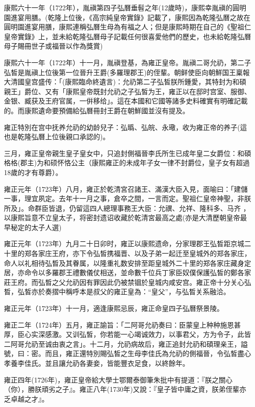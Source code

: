康熙六十一年（1722年），胤禛第四子弘曆垂髫之年(12歲時)，康熙幸胤禛的圓明園進宴用膳。(乾隆上位後，《高宗純皇帝實錄》記載了，康熙因為乾隆弘曆之故在圓明園進宴用膳，康熙連稱弘曆生母為有福之人；但是康熙時期在自己的《聖祖仁皇帝實錄》上，並未給乾隆弘曆母子記載任何很喜愛他們的歷史，也未給乾隆弘曆母子賜冊世子或福晉以作為獎賞)

康熙六十一年（1722年）十一月，胤禛登基，為雍正皇帝。胤禛二哥允礽，第二子弘皙是胤禛上位後第一位晉升王爵(多羅理郡王)的侄輩。朝鲜使臣向朝鮮国王稟報大清國皇宫盛传：「(康熙臨命終遺言)：允礽第二子弘皙朕所鍾愛，其特封为和碩親王」爵位、又有「康熙皇帝既封允礽之子弘皙为王，雍正以在邸时宫室、服御、金银、臧获及王府官属，一倂移给」。這在本國和它國等諸多史料確實有明確記載的。而康熙遺命要預備給弘曆冊封王爵在朝鮮國並沒有提及。

雍正特別在宫中抚养允礽的幼龄兒子：弘㬙、弘皖、永璥，收为雍正帝的养子(這也是乾隆弘曆上位後親口承認的)。

三月，雍正皇帝親生皇子皇女中，只追封側福晉李氏所生已成年皇二女爵位：和碩格格(郡主)为和硕怀恪公主（康熙雍正的未成年子女一律不封爵位，皇子女有超過18歲的才有尊爵）。

雍正元年（1723年）八月，雍正於乾清宮召諸王、滿漢大臣入見，面喻曰：「建儲一事，理宜夙定。去年十一月之事，倉卒之間，一言而定。聖祖仁皇帝神聖，非朕所及」。命群臣皆退，仍留這四人總理事務王大臣：允禩、允祥、隆科多、马齐 ，以康熙旨意不立皇太子，将密封遗诏收藏於乾清宮最高之處(亦是大清歷朝皇帝最早秘定的太子人選)

雍正元年（1723年）九月二十日卯时，雍正以康熙遗命，分家理郡王弘晳距京城二十里的郑各家庄王府，亦下令弘皙携福晋、以及子弟一起迁至皇城外的郑各家庄，命人以礼相待弘晳及其眷属，以隆重礼数安排至距皇城外二十里的郑各家庄藏身定居，亦命令以多羅郡王禮數儀仗相送，並命數千位兵丁家臣奴僕保護弘皙的鄭各家莊王府。而弘晳之父允礽因有罪因此仍被禁锢於皇城内咸安宫。雍正帝十分关心弘晳，弘皙亦於奏摺中稱呼本是叔父的雍正皇為：“皇父”，与弘晳关系融洽。

雍正元年（1723年）十一月，適逢康熙忌辰，雍正命皇四子弘曆祭景陵。

雍正二年（1724年）五月，雍正諭旨：「二阿哥允礽奏曰：臣蒙皇上种种施恩甚厚，臣心实深感激。又训弘皙，你若能一心竭诚效力，以事君父，方为令子，此皆二阿哥允礽至诚由衷之言」。十二月，允礽病故后，雍正追封允礽和碩理亲王，謚號，曰：密。而且，雍正還特別賜弘皙之生母李佳氏為允礽的側福晉，令弘皙盡心孝養李佳氏。並且讓允礽各妻妾，皆能豐衣足食，以終餘年。

雍正四年(1726年)，雍正皇帝給大學士鄂爾泰御筆朱批中有提道：『朕之關心（你），勝朕頑劣之子』。雍正八年(1730年)又說：『皇子皆中庸之資，朕弟侄輩亦乏卓越之才』。

